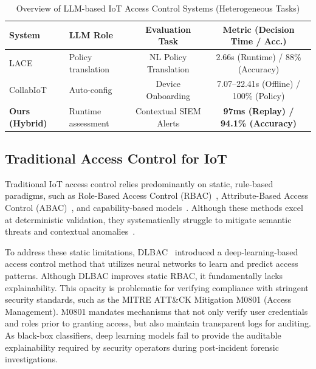 \documentclass[
]{ceurart}
\begin{document}
\begin{table}[htbp]
    \centering
    \caption{Overview of LLM-based IoT Access Control Systems (Heterogeneous Tasks)}
    \label{tab:related_comparison}
    \begin{tabular}{llcc}
        \toprule
        \textbf{System}                & \textbf{LLM Role} & \textbf{Evaluation Task} & \textbf{Metric (Decision Time / Acc.)}\footnotemark \\
        \midrule
        LACE~\cite{lace2025}           & Policy translation & NL Policy Translation & 2.66s (Runtime) / 88\% (Accuracy)    \\
        CollabIoT~\cite{shastri2025llmdrivenautoconfigurationtransient} & Auto-config & Device Onboarding & 7.07--22.41s (Offline) / 100\% (Policy)    \\
        \textbf{Ours (Hybrid)}         & Runtime assessment & Contextual SIEM Alerts & \textbf{97ms (Replay) / 94.1\% (Accuracy)}  \\
        \bottomrule
    \end{tabular}
\end{table}

\subsection{Traditional Access Control for IoT}

Traditional IoT access control relies predominantly on static, rule-based paradigms, such as Role-Based Access Control (RBAC)~\cite{rbac2004}, Attribute-Based Access Control (ABAC)~\cite{abac2012}, and capability-based models~\cite{capability2016}. Although these methods excel at deterministic validation, they systematically struggle to mitigate semantic threats and contextual anomalies~\cite{alaba2017internet, ouaddah2016fairaccess}.

To address these static limitations, DLBAC~\cite{dlbac2022} introduced a deep-learning-based access control method that utilizes neural networks to learn and predict access patterns. Although DLBAC improves static RBAC, it fundamentally lacks explainability. This opacity is problematic for verifying compliance with stringent security standards, such as the MITRE ATT\&CK Mitigation M0801 (Access Management). M0801 mandates mechanisms that not only verify user credentials and roles prior to granting access, but also maintain transparent logs for auditing. As black-box classifiers, deep learning models fail to provide the auditable explainability required by security operators during post-incident forensic investigations.
\end{document}
